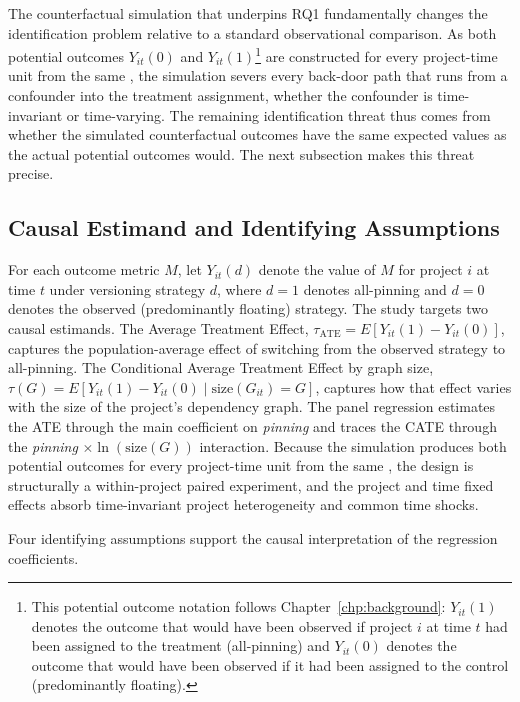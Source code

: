 The counterfactual simulation that underpins RQ1 fundamentally changes the identification problem relative to a standard observational comparison.
As both potential outcomes $Y_{it}(0)$ and $Y_{it}(1)$\footnote{This potential outcome notation follows Chapter~\ref{chp:background}: $Y_{it}(1)$ denotes the outcome that would have been observed if project $i$ at time $t$ had been assigned to the treatment (all-pinning) and $Y_{it}(0)$ denotes the outcome that would have been observed if it had been assigned to the control (predominantly floating).} are constructed for every project-time unit from the same , the simulation severs every back-door path that runs from a confounder into the treatment assignment, whether the confounder is time-invariant or time-varying.
The remaining identification threat thus comes from whether the simulated counterfactual outcomes have the same expected values as the actual potential outcomes would.
The next subsection makes this threat precise.

\subsection{Causal Estimand and Identifying Assumptions}
\label{sec:pinning-credibility-estimand}

For each outcome metric $M$, let $Y_{it}(d)$ denote the value of $M$ for project $i$ at time $t$ under versioning strategy $d$, where $d=1$ denotes all-pinning and $d=0$ denotes the observed (predominantly floating) strategy.
The study targets two causal estimands.
The Average Treatment Effect, $\tau_{\text{ATE}} = E[Y_{it}(1) - Y_{it}(0)]$, captures the population-average effect of switching from the observed strategy to all-pinning.
The Conditional Average Treatment Effect by graph size, $\tau(G) = E[Y_{it}(1) - Y_{it}(0) \mid \text{size}(G_{it}) = G]$, captures how that effect varies with the size of the project's dependency graph.
The panel regression estimates the ATE through the main coefficient on \emph{pinning} and traces the CATE through the \emph{pinning} $\times \ln(\text{size}(G))$ interaction.
Because the simulation produces both potential outcomes for every project-time unit from the same , the design is structurally a within-project paired experiment, and the project and time fixed effects absorb time-invariant project heterogeneity and common time shocks.

Four identifying assumptions support the causal interpretation of the regression coefficients.

